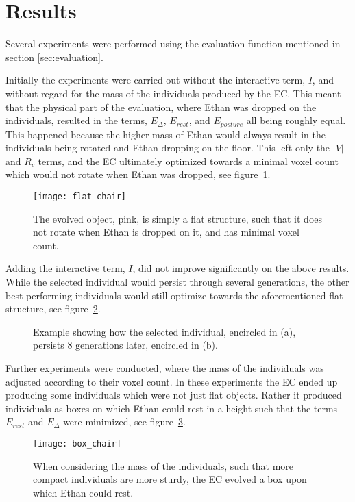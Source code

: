 \section{Results}
Several experiments were performed using the evaluation function mentioned in 
section \ref{sec:evaluation}. 

Initially the experiments were carried out without the interactive term, $I$,
and without regard for the mass of the individuals produced by the EC. This
meant that the physical part of the evaluation, where Ethan was dropped on the
individuals, resulted in the terms, $E_\Delta$, $E_{rest}$, and
$E_{posture}$ all being roughly equal. This happened because the higher mass of
Ethan would always result in the individuals being rotated and Ethan dropping
on the floor. This left only the $|V|$ and $R_c$ terms, and the EC ultimately
optimized towards a minimal voxel count which would not rotate when Ethan was
dropped, see figure~\ref{fig:flat_object}.

\begin{figure}[ht]
\centering
\texttt{[image: flat\_chair]}
\caption{The evolved object, pink, is simply a flat structure, such that it 
does not rotate when Ethan is dropped on it, and has minimal voxel count.}
\label{fig:flat_object}
\end{figure}

Adding the interactive term, $I$, did not improve significantly on the above
results. While the selected individual would persist through several
generations, the other best performing individuals would still optimize towards
the aforementioned flat structure, see figure~\ref{fig:selection}.
\begin{figure}[ht]
\centering
{}
\hfil
{}
\caption{Example showing how the selected individual, encircled in (a), 
persists 8 generations later, encircled in (b).}
\label{fig:selection}
\end{figure}

Further experiments were conducted, where the mass of the individuals was
adjusted according to their voxel count. In these experiments the EC ended up
producing some individuals which were not just flat objects. Rather it 
produced individuals as boxes on which Ethan could rest in a height such that
the terms $E_{rest}$ and $E_\Delta$ were minimized, see 
figure~\ref{fig:boxchair}.

\begin{figure}[ht]
\centering
\texttt{[image: box\_chair]}
\caption{When considering the mass of the individuals, such that more compact 
individuals are more sturdy, the EC evolved a box upon which Ethan could rest.}
\label{fig:boxchair}
\end{figure}